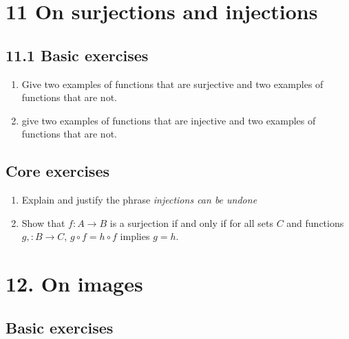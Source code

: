\documentclass[10pt,\jkfside,a4paper]{article}
\begin{document}
\section*{11 On surjections and injections}

\subsection*{11.1 Basic exercises}

\begin{enumerate}

\item Give two examples of functions that are surjective and two examples of functions that are not.



\item give two examples of functions that are injective and two examples of functions that are not.



\end{enumerate}

\subsection*{Core exercises}

\begin{enumerate}

\item Explain and justify the phrase \textit{injections can be undone}



\item Show that $f: A \rightarrow B$ is a surjection if and only if for all sets $C$ and functions $g, : B \rightarrow C$,
$g \circ f = h \circ f$ implies $g = h$.



\end{enumerate}

\section*{12. On images}

\subsection*{Basic exercises}
\end{document}
